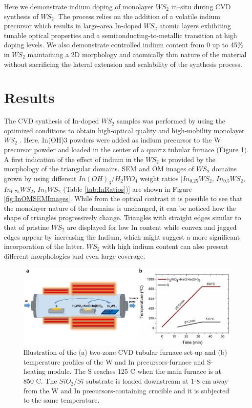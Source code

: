 Here we demonstrate indium doping of monolayer $WS_2$ in–situ during CVD synthesis of $WS_2$. The process relies on the addition of a volatile indium precursor which results in large-area In-doped $WS_2$ atomic layers exhibiting tunable optical properties and a semiconducting-to-metallic transition at high doping levels. We also demonstrate controlled indium content from 0 up to 45\% in $WS_2$ maintaining a 2D morphology and atomically thin nature of the material without sacrificing the lateral extension and scalability of the synthesis process.

\section{Results}

The CVD synthesis of In-doped $WS_2$ samples was performed by using the optimized conditions to obtain high-optical quality and high-mobility monolayer $WS_2$ \cite{Reale2017}. Here, In(OH)3 powders were added as indium precursor to the W precursor powder and loaded in the center of a quartz tubular furnace (Figure \ref{fig:InFurnaceSetup}). A first indication of the effect of indium in the $WS_2$ is provided by the morphology of the triangular domains. SEM and OM images of $WS_2$ domains grown by using different $In(OH)_3/H_2WO_4$ weight ratios [$In_{0.25}WS_2$, $In_{0.5}WS_2$, $In_{0.75}WS_2$, $In_1WS_2$ (Table \ref{tab:InRatios})] are shown in Figure \ref{fig:InOMSEMImages}. While from the optical contrast it is possible to see that the monolayer nature of the domains is unchanged, it can be noticed how the shape of triangles progressively change. Triangles with straight edges similar to that of pristine $WS_2$ are displayed for low In content while convex and jagged edges appear by increasing the Indium, which might suggest a more significant incorporation of the latter. $WS_2$ with high indium content can also present different morphologies and even large coverage.

\begin{figure}[!h]
	\begin{center}
		\includegraphics[scale=0.5]{In/FurnaceSetup.png}
		\caption{Illustration of the (a) two-zone CVD tubular furnace set-up and (b) temperature profiles of the W and In precursors-furnace and S-heating module. The S reaches 125 {\degree}C when the main furnace is at 850 {\degree}C. The $SiO_2/Si$ substrate is loaded downstream at 1-8 cm away from the W and In precursors-containing crucible and it is subjected to the same temperature.}
		\label{fig:InFurnaceSetup}
	\end{center}
\end{figure}

